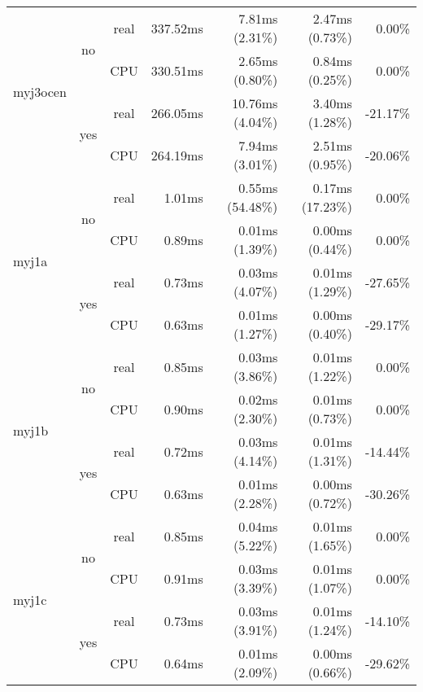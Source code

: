 \documentclass[en]{pracamgr}
\begin{document}
\begin{small}
\begin{longtable}{|l|c|c|r|r|r|r|}
\hline
\multirow{4}{*}{myj3ocen} & \multirow{2}{*}{no}  & real & 337.52ms & 7.81ms (2.31\%) & 2.47ms (0.73\%) & 0.00\% \\*
                          &                      & CPU  & 330.51ms & 2.65ms (0.80\%) & 0.84ms (0.25\%) & 0.00\% \\*
                          \cline{2-7}
                          & \multirow{2}{*}{yes} & real & 266.05ms & 10.76ms (4.04\%) & 3.40ms (1.28\%) & -21.17\% \\*
                          &                      & CPU  & 264.19ms & 7.94ms (3.01\%) & 2.51ms (0.95\%) & -20.06\% \\
\hline
\multirow{4}{*}{myj1a}    & \multirow{2}{*}{no}  & real & 1.01ms & 0.55ms (54.48\%) & 0.17ms (17.23\%) & 0.00\% \\*
                          &                      & CPU  & 0.89ms & 0.01ms (1.39\%) & 0.00ms (0.44\%) & 0.00\% \\*
                          \cline{2-7}
                          & \multirow{2}{*}{yes} & real & 0.73ms & 0.03ms (4.07\%) & 0.01ms (1.29\%) & -27.65\% \\*
                          &                      & CPU  & 0.63ms & 0.01ms (1.27\%) & 0.00ms (0.40\%) & -29.17\% \\
\hline
\multirow{4}{*}{myj1b}    & \multirow{2}{*}{no}  & real & 0.85ms & 0.03ms (3.86\%) & 0.01ms (1.22\%) & 0.00\% \\*
                          &                      & CPU  & 0.90ms & 0.02ms (2.30\%) & 0.01ms (0.73\%) & 0.00\% \\*
                          \cline{2-7}
                          & \multirow{2}{*}{yes} & real & 0.72ms & 0.03ms (4.14\%) & 0.01ms (1.31\%) & -14.44\% \\*
                          &                      & CPU  & 0.63ms & 0.01ms (2.28\%) & 0.00ms (0.72\%) & -30.26\% \\
\hline
\multirow{4}{*}{myj1c}    & \multirow{2}{*}{no}  & real & 0.85ms & 0.04ms (5.22\%) & 0.01ms (1.65\%) & 0.00\% \\*
                          &                      & CPU  & 0.91ms & 0.03ms (3.39\%) & 0.01ms (1.07\%) & 0.00\% \\*
                          \cline{2-7}
                          & \multirow{2}{*}{yes} & real & 0.73ms & 0.03ms (3.91\%) & 0.01ms (1.24\%) & -14.10\% \\*
                          &                      & CPU  & 0.64ms & 0.01ms (2.09\%) & 0.00ms (0.66\%) & -29.62\% \\

\end{longtable}
\end{small}
\end{document}
